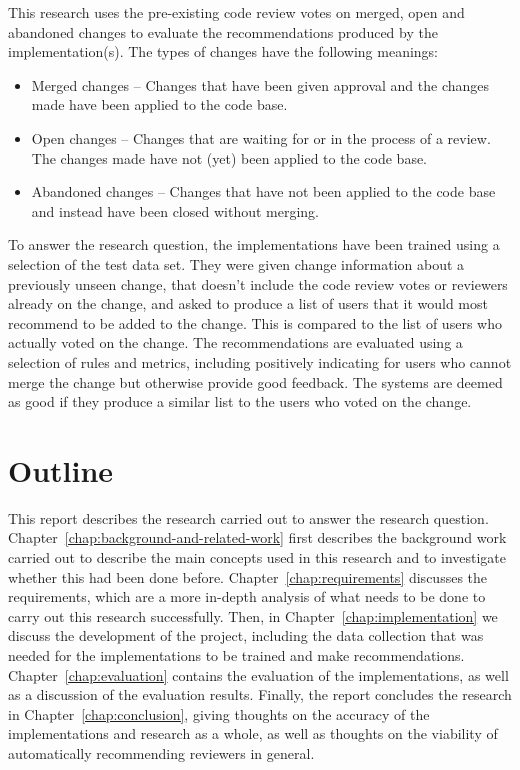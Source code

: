 
This research uses the pre-existing code review votes on merged, open and abandoned changes to evaluate the recommendations produced by the implementation(s). The types of changes have the following meanings:
\begin{itemize}
    \item Merged changes -- Changes that have been given approval and the changes made have been applied to the code base.
    \item Open changes -- Changes that are waiting for or in the process of a review. The changes made have not (yet) been applied to the code base.
    \item Abandoned changes -- Changes that have not been applied to the code base and instead have been closed without merging.
\end{itemize}

To answer the research question, the implementations have been trained using a selection of the test data set. They were given change information about a previously unseen change, that doesn't include the code review votes or reviewers already on the change, and asked to produce a list of users that it would most recommend to be added to the change. This is compared to the list of users who actually voted on the change. The recommendations are evaluated using a selection of rules and metrics, including positively indicating for users who cannot merge the change but otherwise provide good feedback. The systems are deemed as good if they produce a similar list to the users who voted on the change.

\section{Outline}
This report describes the research carried out to answer the research question. Chapter~\ref{chap:background-and-related-work} first describes the background work carried out to describe the main concepts used in this research and to investigate whether this had been done before.
Chapter~\ref{chap:requirements} discusses the requirements, which are a more in-depth analysis of what needs to be done to carry out this research successfully.
Then, in Chapter~\ref{chap:implementation} we discuss the development of the project, including the data collection that was needed for the implementations to be trained and make recommendations. Chapter~\ref{chap:evaluation} contains the evaluation of the implementations, as well as a discussion of the evaluation results.
Finally, the report concludes the research in Chapter~\ref{chap:conclusion}, giving thoughts on the accuracy of the implementations and research as a whole, as well as thoughts on the viability of automatically recommending reviewers in general.